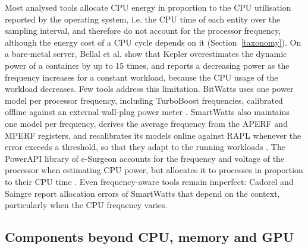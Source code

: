 \documentclass[
  acmsmall,
  screen,
  review,
  xcolor={dvipsnames,usenames}
]{acmart}
\begin{document}
Most analysed tools allocate CPU energy in proportion to the CPU utilisation reported by the operating system, i.e. the CPU time of each entity over the sampling interval, and therefore do not account for the processor frequency, although the energy cost of a CPU cycle depends on it (Section~\ref{taxonomy}). On a bare-metal server, Bellal et al. \cite{bellalInvestigatingPotentialKepler} show that Kepler overestimates the dynamic power of a container by up to 15 times, and reports a decreasing power as the frequency increases for a constant workload, because the CPU usage of the workload decreases. Few tools address this limitation. BitWatts uses one power model per processor frequency, including TurboBoost frequencies, calibrated offline against an external wall-plug power meter \cite{colmantProcesslevelPowerEstimation2015}. SmartWatts also maintains one model per frequency, derives the average frequency from the APERF and MPERF registers, and recalibrates its models online against RAPL whenever the error exceeds a threshold, so that they adapt to the running workloads \cite{fieniSmartWattsSelfCalibratingSoftwareDefined2020}. The PowerAPI library of e-Surgeon accounts for the frequency and voltage of the processor when estimating CPU power, but allocates it to processes in proportion to their CPU time \cite{noureddineMonitoringEnergyHotspots2015}. Even frequency-aware tools remain imperfect: Cadorel and Saingre \cite{cadorelProtocolAssessAccuracy2024b} report allocation errors of SmartWatts that depend on the context, particularly when the CPU frequency varies.

\subsection{Components beyond CPU, memory and GPU}
\end{document}
